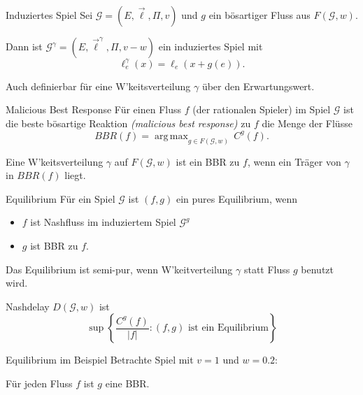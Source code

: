 \documentclass{beamer}
\DeclareMathOperator*{\argmax}{arg\,max}
\begin{document}
\begin{frame}{Induziertes Spiel}
	Sei $\mathcal G = (E, \vec{\ell}, \Pi, v)$ und $g$ ein bösartiger Fluss aus $F(\mathcal G,w)$.
	
	Dann ist $\mathcal G^\gamma = (E, \vec{\ell}^\gamma, \Pi, v-w)$ ein \alert{induziertes Spiel} mit 
	\[ \ell_e^\gamma(x) = \ell_e(x+ g(e)) .\]
	
	Auch definierbar für eine W'keitsverteilung $\gamma$ über den Erwartungswert.
\end{frame}


\begin{frame}{Malicious Best Response}
	Für einen Fluss $f$ (der rationalen Spieler) im Spiel $\mathcal G$ ist die \alert{beste bösartige Reaktion} \emph{(malicious best response)} zu $f$ die Menge der Flüsse
	\[ BBR(f) = \argmax_{g \in F(\mathcal G, w)} \, C^g(f) .\]
	
	Eine W'keitsverteilung $\gamma$ auf $F(\mathcal G, w)$ ist ein BBR zu $f$, wenn ein Träger von $\gamma$ in $BBR(f)$ liegt.
\end{frame}

\begin{frame}{Equilibrium}
	Für ein Spiel $\mathcal G$ ist $(f, g)$ ein \alert{pures Equilibrium}, wenn 
	\begin{itemize}
		\item $f$ ist Nashfluss im induziertem Spiel $\mathcal G^g$
		\item $g$ ist BBR zu $f$.
	\end{itemize}
	
	Das Equilibrium ist \alert{semi-pur}, wenn W'keitverteilung $\gamma$ statt Fluss $g$ benutzt wird.
	
	Nashdelay $D(\mathcal G, w)$ ist
	\[
		\sup \left\{\frac{C^g(f)}{|f|} : (f,g) \text{ ist ein Equilibrium} \right\}
	\]
\end{frame}

\begin{frame}{Equilibrium im Beispiel}
	Betrachte Spiel mit $v=1$ und $w=0.2$:
	
	\begin{figure}
	\end{figure}
	Für jeden Fluss $f$ ist $g$ eine BBR.
\end{frame}
\end{document}
